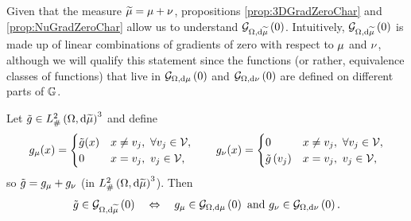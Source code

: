 Given that the measure $\widetilde{\mu} = \mu + \nu$, propositions \ref{prop:3DGradZeroChar} and \ref{prop:NuGradZeroChar} allow us to understand $\mathcal{G}_{ \Omega, \mathrm{d}\widetilde{\mu}}\left( 0 \right)$.
Intuitively, $\mathcal{G}_{ \Omega, \mathrm{d}\widetilde{\mu}}\left( 0 \right)$ is made up of linear combinations of gradients of zero with respect to $\mu$ and $\nu$, although we will qualify this statement since the functions (or rather, equivalence classes of functions) that live in $\mathcal{G}_{ \Omega, \mathrm{d}\mu}\left( 0 \right)$ and $\mathcal{G}_{ \Omega, \mathrm{d}\nu}\left( 0 \right)$ are defined on different parts of $\mathbb{G}$.
\begin{theorem} \label{thm:3DdddmesCharGradZero}
	Let $\tilde{g}\in L^2_{\#}\left( \Omega,\mathrm{d} \widetilde{\mu} \right)^3$ and define
	\begin{align*}
		g_\mu(x) = \begin{cases} \tilde{g}(x) & x\neq v_j, \ \forall v_j\in\mathcal{V}, \\ 0 & x=v_j, \ v_j\in\mathcal{V}, \end{cases}
		\qquad
		g_\nu(x) = \begin{cases} 0 & x\neq v_j, \ \forall v_j\in\mathcal{V}, \\ \tilde{g}\left( v_j \right) & x=v_j, \ v_j\in\mathcal{V}, \end{cases}
	\end{align*}
	so $\tilde{g} = g_\mu + g_\nu$ (in $L^2_{\#}\left( \Omega,\mathrm{d} \widetilde{\mu} \right)^3$).
	Then
	\begin{align*}
		\tilde{g}\in\mathcal{G}_{ \Omega, \mathrm{d}\widetilde{\mu}}\left( 0 \right) \quad\Leftrightarrow\quad
		g_\mu\in\mathcal{G}_{ \Omega, \mathrm{d}\mu}\left( 0 \right) \text{ and } g_\nu\in\mathcal{G}_{ \Omega, \mathrm{d}\nu}\left( 0 \right).
	\end{align*}
\end{theorem}
